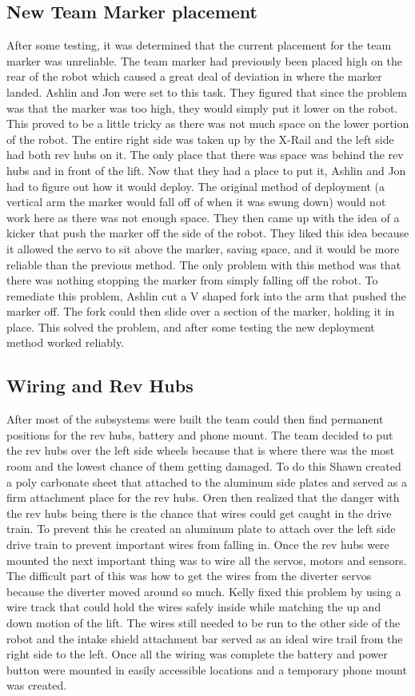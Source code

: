 \documentclass{article}
\begin{document}
\subsection{New Team Marker placement}
After some testing, it was determined that the current placement for the team marker was unreliable. The team marker had previously been placed high on the rear of the robot which caused a great deal of deviation in where the marker landed. Ashlin and Jon were set to this task. They figured that since the problem was that the marker was too high, they would simply put it lower on the robot. This proved to be a little tricky as there was not much space on the lower portion of the robot. The entire right side was taken up by the X-Rail and the left side had both rev hubs on it. The only place that there was space was behind the rev hubs and in front of the lift. Now that they had a place to put it, Ashlin and Jon had to figure out how it would deploy. The original method of deployment (a vertical arm the marker would fall off of when it was swung down) would not work here as there was not enough space. They then came up with the idea of a kicker that push the marker off the side of the robot. They liked this idea because it allowed the servo to sit above the marker, saving space, and it would be more reliable than the previous method. The only problem with this method was that there was nothing stopping the marker from simply falling off the robot. To remediate this problem, Ashlin cut a V shaped fork into the arm that pushed the marker off. The fork could then slide over a section of the marker, holding it in place. This solved the problem, and after some testing the new deployment method worked reliably. 

\subsection{Wiring and Rev Hubs}
After most of the subsystems were built the team could then find permanent positions for the rev hubs, battery and phone mount. The team decided to put the rev hubs over the left side wheels because that is where there was the most room and the lowest chance of them getting damaged. To do this Shawn created a poly carbonate sheet that attached to the aluminum side plates and served as a firm attachment place for the rev hubs. Oren then realized that the danger with the rev hubs being there is the chance that wires could get caught in the drive train. To prevent this he created an aluminum plate to attach over the left side drive train to prevent important wires from falling in. Once the rev hubs were mounted the next important thing was to wire all the servos, motors and sensors. The difficult part of this was how to get the wires from the diverter servos because the diverter moved around so much. Kelly fixed this problem by using a wire track that could hold the wires safely inside while matching the up and down motion of the lift. The wires still needed to be run to the other side of the robot and the intake shield attachment bar served as an ideal wire trail from the right side to the left. Once all the wiring was complete the battery and power button were mounted in easily accessible locations and a temporary phone mount was created.
\end{document}
